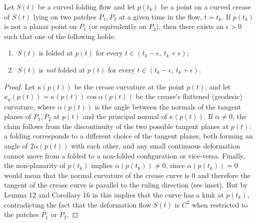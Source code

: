 \begin{theorem}\label{Thm:curved_folding_open_condition}
Let $S(t)$ be a curved folding flow and let $p(t_k)$ be a point on a curved crease of $S(t)$ lying on two patches $P_1,P_2$ at a given time in the flow, $t=t_k$. If $p(t_k)$ is not a planar point on $P_1$ (or equivalently on $P_2$), then there exists an $\epsilon > 0$ such that one of the following holds:
\begin{enumerate}
	\item $\ S(t)$ is folded at $p(t)$ for every $t \in (t_k-\epsilon, \ t_k+\epsilon)$;
	\item $\ S(t)$ is \emph{not} folded at $p(t)$ for every $t \in (t_k-\epsilon, \ t_k+\epsilon)$.
\end{enumerate}
\end{theorem}
\begin{proof}
Let $\kappa(p(t))$ be the crease curvature at the point $p(t)$, and let $\kappa_g(p(t)) = \kappa(p(t))\cos\alpha(p(t))$ be the crease's flattened (geodesic) curvature, where $\alpha(p(t))$ is the angle between the normals of the tangent planes of $P_1,P_2$ at $p(t)$ and the principal normal of $\kappa(p(t))$. If $\alpha \neq 0$, the claim follows from the discontinuity of the two possible tangent planes at $p(t)$: a folding corresponds to a different choice of the tangent planes, both forming an angle of $2\alpha(p(t))$ with each other, and any small continuous deformation cannot move from a folded to a non-folded configuration or vice-versa. Finally, the non-planarity of $p(t_k)$ implies $\alpha(p(t_k)) \neq 0$, since $\alpha(p(t_k)) = 0$ would mean that the normal curvature of the crease curve is $0$ and therefore the tangent of the crease curve is parallel to the ruling direction (see inset). But by Lemma 12 and Corollary 16 in \cite{demaine_lens} this implies that the curve has a kink at  $p(t_k)$, contradicting the fact that the deformation flow $S(t)$ is $C^2$ when restricted to the patches $P_1$ or $P_2$.
\end{proof}
\setlength{\columnsep}{8pt}%
